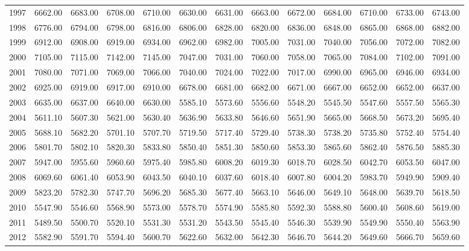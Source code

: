 \begin{longtable}{rrrrrrrrrrrrr}
  1997 & 6662.00 & 6683.00 & 6708.00 & 6710.00 & 6630.00 & 6631.00 & 6663.00 & 6672.00 & 6684.00 & 6710.00 & 6733.00 & 6743.00 \\ 
  1998 & 6776.00 & 6794.00 & 6798.00 & 6816.00 & 6806.00 & 6828.00 & 6820.00 & 6836.00 & 6848.00 & 6865.00 & 6868.00 & 6882.00 \\ 
  1999 & 6912.00 & 6908.00 & 6919.00 & 6934.00 & 6962.00 & 6982.00 & 7005.00 & 7031.00 & 7040.00 & 7056.00 & 7072.00 & 7082.00 \\ 
  2000 & 7105.00 & 7115.00 & 7142.00 & 7145.00 & 7047.00 & 7031.00 & 7060.00 & 7058.00 & 7065.00 & 7084.00 & 7102.00 & 7091.00 \\ 
  2001 & 7080.00 & 7071.00 & 7069.00 & 7066.00 & 7040.00 & 7024.00 & 7022.00 & 7017.00 & 6990.00 & 6965.00 & 6946.00 & 6934.00 \\ 
  2002 & 6925.00 & 6919.00 & 6917.00 & 6910.00 & 6678.00 & 6681.00 & 6682.00 & 6671.00 & 6667.00 & 6652.00 & 6652.00 & 6637.00 \\ 
  2003 & 6635.00 & 6637.00 & 6640.00 & 6630.00 & 5585.10 & 5573.60 & 5556.60 & 5548.20 & 5545.50 & 5547.60 & 5557.50 & 5565.30 \\ 
  2004 & 5611.10 & 5607.30 & 5621.00 & 5630.40 & 5636.90 & 5633.80 & 5646.60 & 5651.90 & 5665.00 & 5668.50 & 5673.20 & 5695.40 \\ 
  2005 & 5688.10 & 5682.20 & 5701.10 & 5707.70 & 5719.50 & 5717.40 & 5729.40 & 5738.30 & 5738.20 & 5735.80 & 5752.40 & 5754.40 \\ 
  2006 & 5801.70 & 5802.10 & 5820.30 & 5833.80 & 5850.40 & 5851.30 & 5850.60 & 5853.30 & 5865.60 & 5862.40 & 5876.50 & 5885.30 \\ 
  2007 & 5947.00 & 5955.60 & 5960.60 & 5975.40 & 5985.80 & 6008.20 & 6019.30 & 6018.70 & 6028.50 & 6042.70 & 6053.50 & 6047.00 \\ 
  2008 & 6069.60 & 6061.40 & 6053.90 & 6043.50 & 6040.10 & 6037.60 & 6018.40 & 6007.80 & 6004.20 & 5983.70 & 5949.90 & 5909.40 \\ 
  2009 & 5823.20 & 5782.30 & 5747.70 & 5696.20 & 5685.30 & 5677.40 & 5663.10 & 5646.00 & 5649.10 & 5648.00 & 5639.70 & 5618.50 \\ 
  2010 & 5547.90 & 5546.60 & 5568.90 & 5573.00 & 5578.70 & 5574.90 & 5585.80 & 5592.30 & 5588.80 & 5600.40 & 5608.60 & 5619.00 \\ 
  2011 & 5489.50 & 5500.70 & 5520.10 & 5531.30 & 5531.20 & 5543.50 & 5545.40 & 5546.30 & 5539.90 & 5549.90 & 5550.40 & 5563.90 \\ 
  2012 & 5582.90 & 5591.70 & 5594.40 & 5600.70 & 5622.60 & 5632.00 & 5642.30 & 5646.70 & 5644.20 & 5649.60 & 5666.70 & 5659.60 \\ 

\end{longtable}
